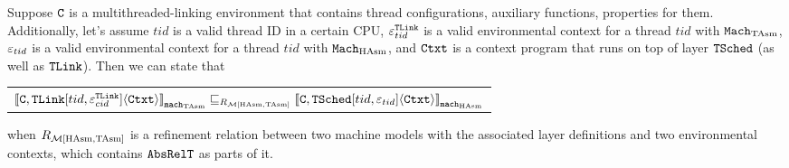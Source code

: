 \begin{lemma}
\label{lemma:chapter:conlink:tasm-refines-hasm}
Suppose  ${{\mathrm{\texttt{C}}}}$ is a multithreaded-linking environment that contains thread configurations, auxiliary functions, properties for them. 
Additionally, let's assume  
$tid$ is a valid thread ID in a certain CPU,
  ${\varepsilon}^{{{\mathrm{\texttt{TLink}}}}}_{tid}$ is a valid
environmental context for a thread $tid$ with ${\mathrm{\texttt{Mach}}}_{\mathrm{TAsm}}$,
 ${\varepsilon}_{tid}$ is a valid
environmental context for a thread $tid$ with ${\mathrm{\texttt{Mach}}}_{\mathrm{HAsm}}$,
and ${\mathrm{\texttt{Ctxt}}}$ is a
context program that runs on top of layer ${{\mathrm{\texttt{TSched}}}}$ (as well as ${{\mathrm{\texttt{TLink}}}}$).
 Then we can state that
 \begin{center}
\begin{tabular}{c}
${[\![{{{\mathrm{\texttt{C}}}}, {{\mathrm{\texttt{TLink}}}}[tid, {\varepsilon}^{{{\mathrm{\texttt{TLink}}}}}_{cid}]} \langle {{\mathrm{\texttt{Ctxt}}}} \rangle]\!]}_{{\mathrm{\texttt{mach}}}_{\mathrm{TAsm}}} \sqsubseteq_{R_{\mathcal{M}{[\mathrm{HAsm}, \mathrm{TAsm}]}}} {[\![{{{\mathrm{\texttt{C}}}}, {{\mathrm{\texttt{TSched}}}}[tid, {\varepsilon}_{tid}]} \langle {{\mathrm{\texttt{Ctxt}}}} \rangle]\!]}_{{{\mathrm{\texttt{mach}}}_{\mathrm{HAsm}}}}$\\
\end{tabular}
\end{center}
when $R_{\mathcal{M}{[\mathrm{HAsm}, \mathrm{TAsm}]}}$ is a refinement relation between two machine models with the associated layer definitions and
 two environmental contexts,
which contains ${{\mathrm{\texttt{AbsRelT}}}}$ as parts of it.
\end{lemma}

